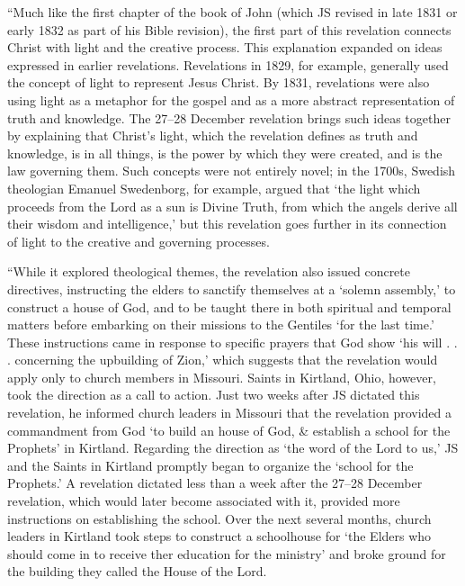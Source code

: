 				``Much like the first chapter of the book of John (which JS revised in late 1831 or early 1832 as part of his Bible revision), the first part of this revelation connects Christ with light and the creative process. This explanation expanded on ideas expressed in earlier revelations. Revelations in 1829, for example, generally used the concept of light to represent Jesus Christ. By 1831, revelations were also using light as a metaphor for the gospel and as a more abstract representation of truth and knowledge. The 27--28 December revelation brings such ideas together by explaining that Christ's light, which the revelation defines as truth and knowledge, is in all things, is the power by which they were created, and is the law governing them. Such concepts were not entirely novel; in the 1700s, Swedish theologian Emanuel Swedenborg, for example, argued that `the light which proceeds from the Lord as a sun is Divine Truth, from which the angels derive all their wisdom and intelligence,' but this revelation goes further in its connection of light to the creative and governing processes.

				``While it explored theological themes, the revelation also issued concrete directives, instructing the elders to sanctify themselves at a `solemn assembly,' to construct a house of God, and to be taught there in both spiritual and temporal matters before embarking on their missions to the Gentiles `for the last time.' These instructions came in response to specific prayers that God show `his will . . . concerning the upbuilding of Zion,' which suggests that the revelation would apply only to church members in Missouri. Saints in Kirtland, Ohio, however, took the direction as a call to action. Just two weeks after JS dictated this revelation, he informed church leaders in Missouri that the revelation provided a commandment from God `to build an house of God, \& establish a school for the Prophets' in Kirtland. Regarding the direction as `the word of the Lord to us,' JS and the Saints in Kirtland promptly began to organize the `school for the Prophets.' A revelation dictated less than a week after the 27--28 December revelation, which would later become associated with it, provided more instructions on establishing the school. Over the next several months, church leaders in Kirtland took steps to construct a schoolhouse for `the Elders who should come in to receive ther education for the ministry' and broke ground for the building they called the House of the Lord.


